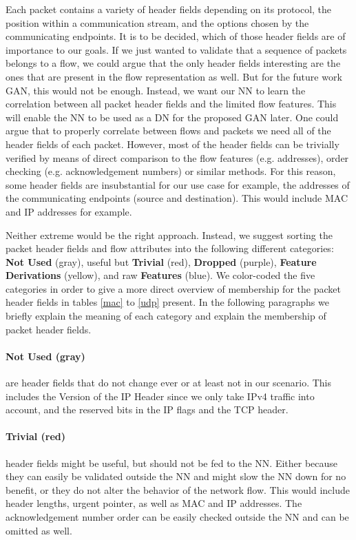 \documentclass[
	ngerman,
	ruledheaders=section,%
	class=report,%
	thesis={type=bachelor},%
	accentcolor=9c,%
	custommargins=true,%
	marginpar=false,%
	parskip=half-,%
	fontsize=11pt,%
	twoside
]{tudapub}
\begin{document}
Each packet contains a variety of header fields depending on its protocol, the position within a communication stream, and the options chosen by the communicating endpoints.
It is to be decided, which of those header fields are of importance to our goals.
If we just wanted to validate that a sequence of packets belongs to a flow, we could argue that the only header fields interesting are the ones that are present in the flow representation as well.
But for the future work GAN, this would not be enough.
Instead, we want our NN to learn the correlation between all packet header fields and the limited flow features.
This will enable the NN to be used as a DN for the proposed GAN later.
One could argue that to properly correlate between flows and packets we need all of the header fields of each packet.
However, most of the header fields can be trivially verified by means of direct comparison to the flow features (e.g. addresses), order checking (e.g. acknowledgement numbers) or similar methods.
For this reason, some header fields are insubstantial for our use case for example, the addresses of the communicating endpoints (source and destination).
This would include MAC and IP addresses for example.

Neither extreme would be the right approach.
Instead, we suggest sorting the packet header fields and flow attributes into the following different categories:
\colorbox{not}{\textbf{{Not Used}} (gray)},
useful but \colorbox{trivial}{\textbf{Trivial} (red)},
\colorbox{dropped}{\textbf{Dropped} (purple)},
\colorbox{derivation}{\textbf{Feature Derivations} (yellow)},
and raw \colorbox{feature}{\textbf{Features} (blue)}.
We color-coded the five categories in order to give a more direct overview of membership for the packet header fields in tables \ref{mac} to \ref{udp} present.
In the following paragraphs we briefly explain the meaning of each category and explain the membership of packet header fields.

\paragraph{\colorbox{not}{\textbf{{Not Used} (gray)}}} are header fields that do not change ever or at least not in our scenario.
This includes the Version of the IP Header since we only take IPv4 traffic into account,
and the reserved bits in the IP flags and the TCP header.

\paragraph{\colorbox{trivial}{\textbf{Trivial} (red)}} header fields might be useful, but should not be fed to the NN.
Either because they can easily be validated outside the NN and might slow the NN down for no benefit,
or they do not alter the behavior of the network flow.
This would include header lengths, urgent pointer, as well as MAC and IP addresses.
The acknowledgement number order can be easily checked outside the NN and can be omitted as well.
\end{document}
